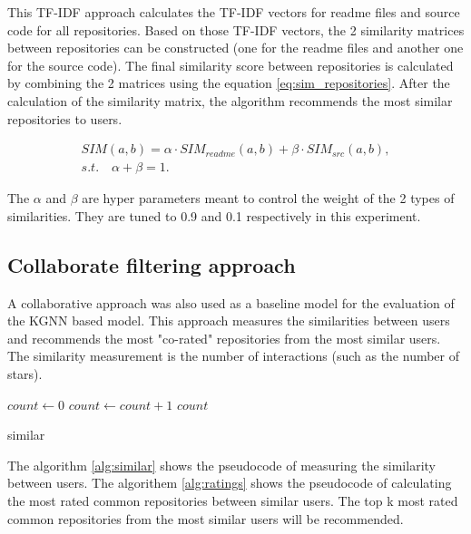 \documentclass[11pt,twoside]{report}
\begin{document}
This TF-IDF approach calculates the TF-IDF vectors for readme files and source code for all repositories. Based on those TF-IDF vectors, the 2 similarity matrices between repositories can be constructed (one for the readme files and another one for the source code). The final similarity score between repositories is calculated by combining the 2 matrices using the equation \ref{eq:sim_repositories}. After the calculation of the similarity matrix, the algorithm recommends the most similar repositories to users.

\begin{gather}
    SIM(a,b)=\alpha\cdot{SIM_{readme}(a,b)}+\beta\cdot{SIM_{src}(a,b)}, \\
    s.t.\quad\alpha+\beta=1.
    \label{eq:sim_repositories}
\end{gather}

The $\alpha$ and $\beta$ are hyper parameters meant to control the weight of the 2 types of similarities. They are tuned to 0.9 and 0.1 respectively in this experiment.

\subsection{Collaborate filtering approach}
A collaborative approach \cite{guendouz_recommending_2015} was also used as a baseline model for the evaluation of the KGNN based model. This approach measures the similarities between users and recommends the most "co-rated" repositories from the most similar users. The similarity measurement is the number of interactions (such as the number of stars).

\begin{algorithm}[H]
    \DontPrintSemicolon
    

    $count \leftarrow 0$ \newline
    {
        {
            $count \leftarrow count + 1$
        }
    }
    \Return $count$
    
    \caption{similar}
    \label{alg:similar}
\end{algorithm}

The algorithm \ref{alg:similar} shows the pseudocode of measuring the similarity between users. The algorithem \ref{alg:ratings} shows the pseudocode of calculating the most rated common repositories between similar users. The top k most rated common repositories from the most similar users will be recommended.
\end{document}
